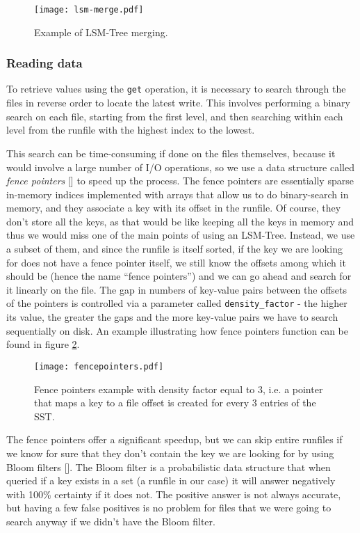 \begin{figure}[h]
    \centering
    \texttt{[image: lsm-merge.pdf]}
    \caption{Example of LSM-Tree merging.}
    \label{fig:lsm-merge}
\end{figure}

\subsubsection{Reading data}

To retrieve values using the \verb"get" operation, it is necessary to search through the files in reverse order to locate the latest write.
This involves performing a binary search on each file, starting from the first level, and then searching within each level from the runfile with the highest index to the lowest.

This search can be time-consuming if done on the files themselves, because it would involve a large number of I/O operations, so we use a data structure called \textit{fence pointers} [\cite{fence-pointers}] to speed up the process. The fence pointers are essentially sparse in-memory indices implemented with arrays that allow us to do binary-search in memory, and they associate a key with its offset in the runfile. Of course, they don't store all the keys, as that would be like keeping all the keys in memory and thus we would miss one of the main points of using an LSM-Tree. Instead, we use a subset of them, and since the runfile is itself sorted, if the key we are looking for does not have a fence pointer itself, we still know the offsets among which it should be (hence the name ``fence pointers'') and we can go ahead and search for it linearly on the file. The gap in numbers of key-value pairs between the offsets of the pointers is controlled via a parameter called \verb"density_factor" - the higher its value, the greater the gaps and the more key-value pairs we have to search sequentially on disk. An example illustrating how fence pointers function can be found in figure \ref{fig:fence-pointers}.

\begin{figure}[h]
    \centering
    \texttt{[image: fencepointers.pdf]}
    \caption{Fence pointers example with density factor equal to 3, i.e. a pointer that maps a key to a file offset is created for every 3 entries of the SST.}
    \label{fig:fence-pointers}
\end{figure}

The fence pointers offer a significant speedup, but we can skip entire runfiles if we know for sure that they don't contain the key we are looking for by using Bloom filters [\cite{bloom-filters}]. The Bloom filter is a probabilistic data structure that when queried if a key exists in a set (a runfile in our case) it will answer negatively with 100\% certainty if it does not. The positive answer is not always accurate, but having a few false positives is no problem for files that we were going to search anyway if we didn't have the Bloom filter.

